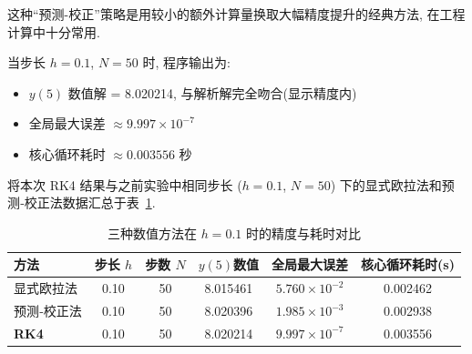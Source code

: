 \documentclass[zihao=-4,a4paper]{ctexart}
\begin{document}
这种“预测-校正”策略是用较小的额外计算量换取大幅精度提升的经典方法, 在工程计算中十分常用. 



当步长 $h=0.1$, $N=50$ 时, 程序输出为: 
\begin{itemize}
    \item $y(5)$ 数值解 = 8.020214, 与解析解完全吻合(显示精度内)
    \item 全局最大误差 $\approx 9.997\times10^{-7}$
    \item 核心循环耗时 $\approx 0.003556$ 秒
\end{itemize}


将本次 RK4 结果与之前实验中相同步长 ($h=0.1$, $N=50$) 下的显式欧拉法和预测‑校正法数据汇总于表~\ref{tab:compare}. 

\begin{table}[H]
    \centering
    \caption{三种数值方法在 $h=0.1$ 时的精度与耗时对比}
    \label{tab:compare}
    \begin{tabular}{@{}lccccc@{}}
        \toprule
        方法 & 步长 $h$ & 步数 $N$ & $y(5)$数值 & 全局最大误差 & 核心循环耗时(s) \\
        \midrule
        显式欧拉法   & 0.10 & 50 & 8.015461 & $5.760\times10^{-2}$ & 0.002462 \\
        预测‑校正法  & 0.10 & 50 & 8.020396 & $1.985\times10^{-3}$ & 0.002938 \\
        \textbf{RK4} & 0.10 & 50 & 8.020214 & \textbf{$9.997\times10^{-7}$} & 0.003556 \\
        \bottomrule
    \end{tabular}
\end{table}
\end{document}
